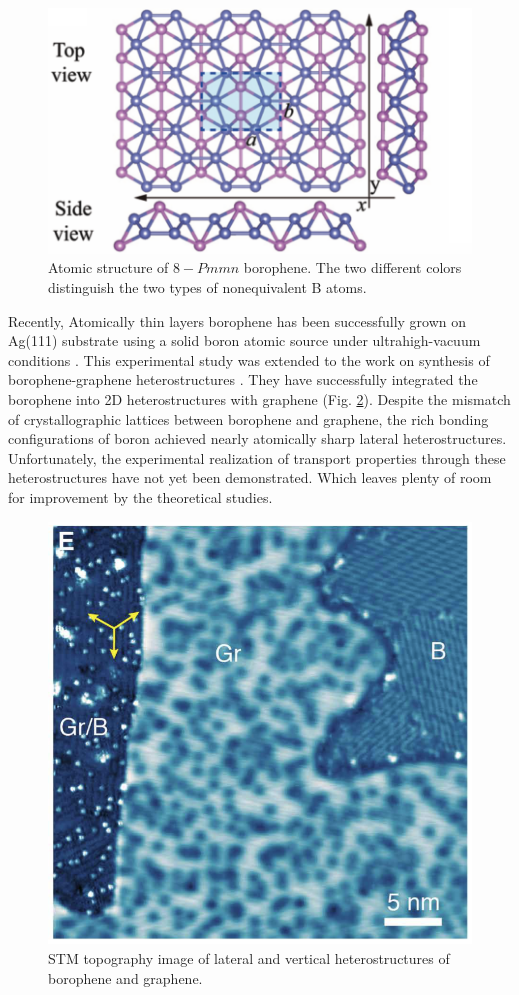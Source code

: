     \begin{figure}[H]
        \centering
        \includegraphics[width = 0.6\linewidth]{fig/Chap 2/borophene atomic structure.png}
        \caption{Atomic structure of $8-Pmmn$ borophene. The two different colors distinguish the two types of nonequivalent B atoms.}
        \label{2fig:borophene atomic structure}
    \end{figure}
    
    Recently, Atomically thin layers borophene has been successfully grown on Ag(111) substrate using a solid boron atomic source under ultrahigh-vacuum conditions \cite{Mannix2015a}.
    This experimental study was extended to the work on synthesis of borophene-graphene heterostructures \cite{Liu2019}.
    They have successfully integrated the borophene into 2D heterostructures with graphene (Fig. \ref{2fig:borophene graphene hetero}).
    Despite the mismatch of crystallographic lattices between borophene and graphene, the rich bonding configurations of boron achieved nearly atomically sharp lateral heterostructures.
    Unfortunately, the experimental realization of transport properties through these heterostructures have not yet been demonstrated.
    Which leaves plenty of room for improvement by the theoretical studies.
    
    \begin{figure}[H]
        \centering
        \includegraphics[width = 0.4\linewidth]{fig/Chap 2/borophene graphene.png}
        \caption{STM topography image of lateral and vertical heterostructures of borophene and graphene.}
        \label{2fig:borophene graphene hetero}
    \end{figure}
    


